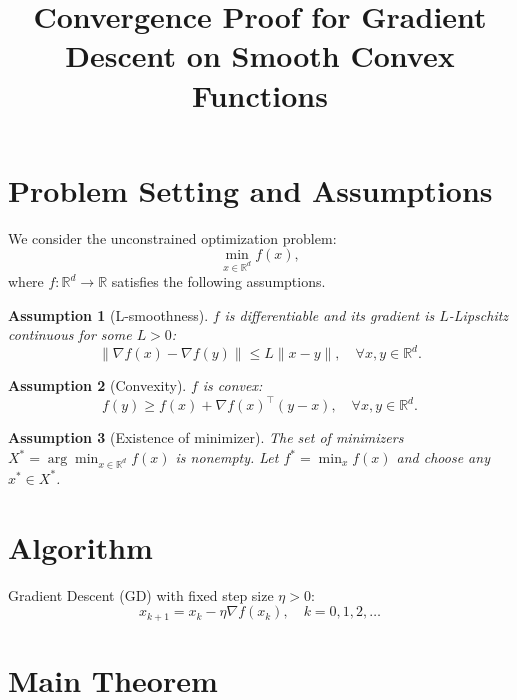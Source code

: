 \documentclass{article}
\title{Convergence Proof for Gradient Descent on Smooth Convex Functions}
\author{}
\date{}
\newtheorem{assumption}{Assumption}
\begin{document}
\maketitle

\section{Problem Setting and Assumptions}

We consider the unconstrained optimization problem:
\begin{equation}
    \min_{x \in \mathbb{R}^d} f(x),
\end{equation}
where $f: \mathbb{R}^d \to \mathbb{R}$ satisfies the following assumptions.

\begin{assumption}[L-smoothness] \label{assump:smooth}
    $f$ is differentiable and its gradient is $L$-Lipschitz continuous for some $L > 0$:
    \begin{equation}
        \|\nabla f(x) - \nabla f(y)\| \le L \|x - y\|, \quad \forall x, y \in \mathbb{R}^d.
    \end{equation}
\end{assumption}

\begin{assumption}[Convexity] \label{assump:convex}
    $f$ is convex:
    \begin{equation}
        f(y) \ge f(x) + \nabla f(x)^\top (y - x), \quad \forall x, y \in \mathbb{R}^d.
    \end{equation}
\end{assumption}

\begin{assumption}[Existence of minimizer] \label{assump:minimizer}
    The set of minimizers $X^* = \arg\min_{x \in \mathbb{R}^d} f(x)$ is nonempty. Let $f^* = \min_x f(x)$ and choose any $x^* \in X^*$.
\end{assumption}

\section{Algorithm}

Gradient Descent (GD) with fixed step size $\eta > 0$:
\begin{equation}
    x_{k+1} = x_k - \eta \nabla f(x_k), \quad k = 0, 1, 2, \dots
\end{equation}

\section{Main Theorem}
\end{document}

